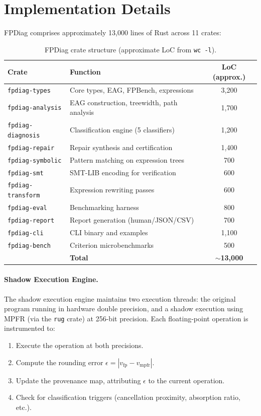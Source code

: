 \documentclass[11pt]{article}
\begin{document}
\section{Implementation Details}
\label{sec:impl}

FPDiag comprises approximately 13,000 lines of Rust across 11 crates:

\begin{table}[t]
\centering
\caption{FPDiag crate structure (approximate LoC from \texttt{wc -l}).}
\begin{tabular}{llc}
\toprule
\textbf{Crate} & \textbf{Function} & \textbf{LoC (approx.)} \\
\midrule
\texttt{fpdiag-types} & Core types, EAG, FPBench, expressions & 3,200 \\
\texttt{fpdiag-analysis} & EAG construction, treewidth, path analysis & 1,700 \\
\texttt{fpdiag-diagnosis} & Classification engine (5 classifiers) & 1,200 \\
\texttt{fpdiag-repair} & Repair synthesis and certification & 1,400 \\
\texttt{fpdiag-symbolic} & Pattern matching on expression trees & 700 \\
\texttt{fpdiag-smt} & SMT-LIB encoding for verification & 600 \\
\texttt{fpdiag-transform} & Expression rewriting passes & 600 \\
\texttt{fpdiag-eval} & Benchmarking harness & 800 \\
\texttt{fpdiag-report} & Report generation (human/JSON/CSV) & 700 \\
\texttt{fpdiag-cli} & CLI binary and examples & 1,100 \\
\texttt{fpdiag-bench} & Criterion microbenchmarks & 500 \\
\midrule
& \textbf{Total} & $\sim$\textbf{13,000} \\
\bottomrule
\end{tabular}
\end{table}

\paragraph{Shadow Execution Engine.}
The shadow execution engine maintains two execution threads: the original program running in hardware double precision, and a shadow execution using MPFR (via the \texttt{rug} crate) at 256-bit precision. Each floating-point operation is instrumented to:
\begin{enumerate}
\item Execute the operation at both precisions.
\item Compute the rounding error $\epsilon = |v_{\text{fp}} - v_{\text{mpfr}}|$.
\item Update the provenance map, attributing $\epsilon$ to the current operation.
\item Check for classification triggers (cancellation proximity, absorption ratio, etc.).
\end{enumerate}
\end{document}
